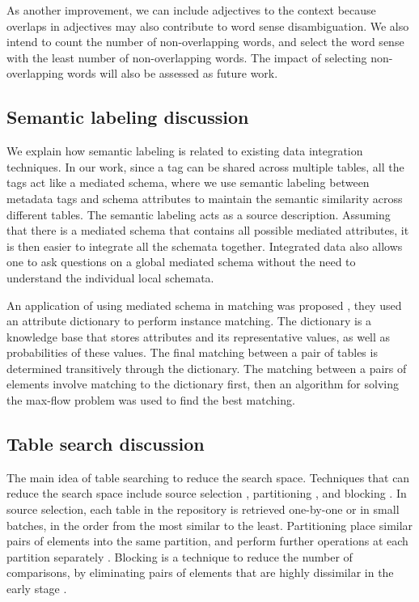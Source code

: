 As another improvement, we can include adjectives to the context because overlaps in adjectives may also contribute to word sense disambiguation. We also intend to count the number of non-overlapping words, and select the word sense with the least number of non-overlapping words. The impact of selecting non-overlapping words will also be assessed as future work.

\subsection{Semantic labeling discussion}

We explain how semantic labeling is related to existing data integration techniques. In our work, since a tag can be shared across multiple tables, all the tags act like a mediated schema, where we use semantic labeling between metadata tags and schema attributes to maintain the semantic similarity across different tables. The semantic labeling acts as a source description. Assuming that there is a mediated schema that contains all possible mediated attributes, it is then easier to integrate all the schemata together. Integrated data also allows one to ask questions on a global mediated schema without the need to understand the individual local schemata.

An application of using mediated schema in matching was proposed \cite{DBLP:journals/pvldb/ChanialDGLNM18}, they used an attribute dictionary to perform instance matching. The dictionary is a knowledge base that stores attributes and its representative values, as well as probabilities of these values. The final matching between a pair of tables is determined transitively through the dictionary. The matching between a pairs of elements involve matching to the dictionary first, then an algorithm for solving the max-flow problem was used to find the best matching.

\subsection{Table search discussion}

The main idea of table searching to reduce the search space. Techniques that can reduce the search space include source selection \cite{Dong2012Proceedings}, partitioning \cite{Moawed2018Arabian}, and blocking \cite{Mudgal2018Deep}. In source selection, each table in the repository is retrieved one-by-one or in small batches, in the order from the most similar to the least. Partitioning place similar pairs of elements into the same partition, and perform further operations at each partition separately \cite{10.1145/1066157.1066283}. Blocking is a technique to reduce the number of comparisons, by eliminating pairs of elements that are highly dissimilar in the early stage \cite{Ehrig2004QOM}.

